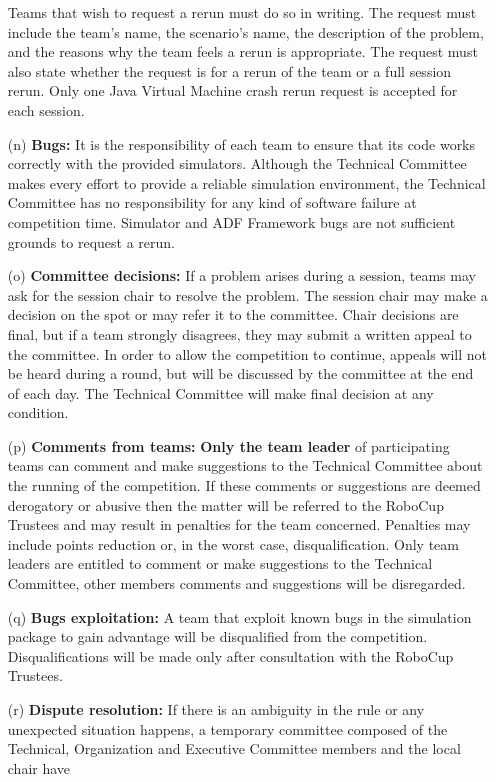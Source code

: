 \documentclass{article}
\begin{document}
\begin{itemize}
Teams that wish to request a rerun must do so in writing. The request must 
include the team's name, the scenario's name, the description of the problem,
and the reasons why the team feels a rerun is appropriate. The request must also
state whether the request is for a rerun of the team or a full session rerun.
Only one Java Virtual Machine crash rerun request is accepted for each session.
\item[(n)] \textbf{Bugs:} It is the responsibility of each team to ensure that 
its code works correctly with the provided simulators. Although the Technical
Committee makes every effort to provide a reliable simulation environment, the
Technical Committee has no responsibility for any kind of software failure at
competition time. Simulator and ADF Framework bugs are not sufficient grounds to
request a rerun.
\item[(o)] \textbf{Committee decisions:} If a problem arises during a session, 
teams may ask for the session chair to resolve the problem. The session chair 
may make a decision on the spot or may refer it to the committee. Chair 
decisions are final, but if a team strongly disagrees, they may submit a 
written appeal to the committee. In order to allow the competition to continue, 
appeals will not be heard during a round, but will be discussed by the 
committee at the end of each day. The Technical Committee will make final 
decision at any condition.
\item[(p)] \textbf{Comments from teams:} \textbf{Only the team leader} of 
participating teams can comment and make suggestions to the Technical Committee 
about the running of the competition. If these comments or suggestions are 
deemed derogatory or abusive then the matter will be referred to the RoboCup 
Trustees and may result in penalties for the team concerned. Penalties may 
include points reduction or, in the worst case, disqualification. Only team 
leaders are entitled to comment or make suggestions to the Technical Committee,
other members comments and suggestions will be disregarded.
\item[(q)] \textbf{Bugs exploitation:} A team that exploit known bugs in the 
simulation package to gain advantage will be disqualified from the competition. 
Disqualifications will be made only after consultation with the RoboCup 
Trustees.
\item[(r)] \textbf{Dispute resolution:} If there is an ambiguity in the rule or
any unexpected situation happens, a temporary committee composed of the
Technical, Organization and Executive Committee members and the local chair have

\end{itemize}
\end{document}
